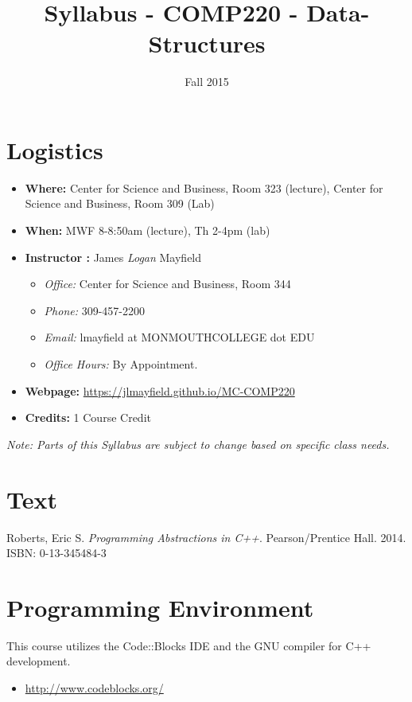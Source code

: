 \documentclass[10pt]{article}
\title{Syllabus - COMP220 - Data-Structures}
\author{ }
\date{Fall 2015}
\begin{document}
\maketitle

\section{Logistics}
\begin{itemize}
\item \textbf{Where: } Center for Science and Business, Room 323 (lecture), Center for Science and Business, Room 309 (Lab)
\item \textbf{When: } MWF 8-8:50am (lecture), Th 2-4pm (lab)
\item \textbf{Instructor :} James \textit{Logan} Mayfield
\begin{itemize}
\item \textit{Office: } Center for Science and Business, Room 344
\item \textit{Phone: } 309-457-2200
\item \textit{Email: } lmayfield at MONMOUTHCOLLEGE dot EDU
\item \textit{Office Hours: }   By Appointment. 
\end{itemize}
\item \textbf{Webpage: } \url{https://jlmayfield.github.io/MC-COMP220}
\item \textbf{Credits: } 1 Course Credit
\end{itemize}
\emph{Note: Parts of this Syllabus are subject to change based on specific class needs.}

\section{Text}

Roberts, Eric S.  \textit{Programming Abstractions in C++}. Pearson/Prentice Hall. 2014. ISBN: 0-13-345484-3


\section{Programming Environment}

This course utilizes the Code::Blocks IDE and the GNU compiler for C++ development. 
\begin{itemize}
\item \url{http://www.codeblocks.org/}
\end{itemize}
\end{document}

